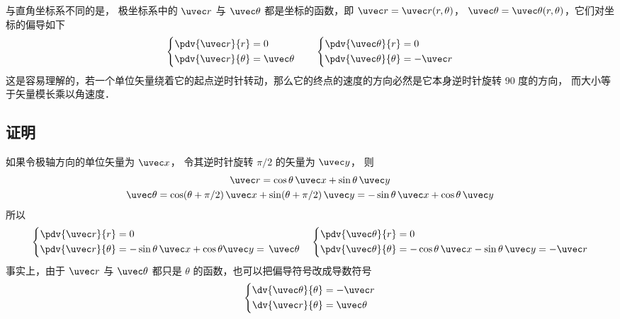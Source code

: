 

与直角坐标系不同的是， 极坐标系中的 $\uvec r$ 与 $\uvec \theta $ 都是坐标的函数，即 $\uvec r = \uvec r (r,\theta)$， $\uvec \theta  = \uvec \theta (r,\theta)$，它们对坐标的偏导如下
\begin{equation}\label{Dpol1_eq1}
\left\{ \begin{aligned}
\pdv{\uvec r}{r} &= 0\\
\pdv{\uvec r}{\theta} &= \uvec \theta 
\end{aligned} \right.
\qquad
\left\{ \begin{aligned}
\pdv{\uvec \theta}{r} &= 0\\
\pdv{\uvec \theta}{\theta} &=  - \uvec r
\end{aligned} \right.
\end{equation}
这是容易理解的，若一个单位矢量绕着它的起点逆时针转动，那么它的终点的速度的方向必然是它本身逆时针旋转 90 度的方向， 而大小等于矢量模长乘以角速度．
\subsection{证明}
如果令极轴方向的单位矢量为 $\uvec x$， 令其逆时针旋转 $\pi/2$ 的矢量为 $\uvec y$， 则
\begin{gather}
\uvec r = \cos \theta \,\uvec x + \sin \theta \,\uvec y\\
\uvec \theta  = \cos (\theta +\pi/2)\,\uvec x + \sin (\theta +\pi/2)\,\uvec y
=  - \sin \theta \,\uvec x + \cos \theta \,\uvec y
\end{gather} 
所以
\begin{equation}
\left\{ \begin{aligned}
\pdv{\uvec r}{r} &= 0\\
\pdv{\uvec r}{\theta} &=  - \sin \theta \,\uvec x + \cos \theta \uvec y = \,\uvec \theta 
\end{aligned} \right.
\quad
\left\{ \begin{aligned}
\pdv{\uvec \theta}{r} &= 0\\
\pdv{\uvec \theta}{\theta} &=  - \cos \theta \,\uvec x - \sin \theta \,\uvec y =  - \uvec r
\end{aligned} \right.
\end{equation}  
事实上，由于 $\uvec r$ 与 $\uvec \theta $ 都只是 $\theta$ 的函数，也可以把偏导符号改成导数符号
 \begin{equation}
\left\{ \begin{aligned}
\dv{\uvec \theta}{\theta} &=  - \uvec r\\
\dv{\uvec r}{\theta} &= \uvec \theta 
\end{aligned} \right.
\end{equation}
 
 
 
 
 
 
 
 
 
 
 
 
 
 
 
 
 
 
 
 
 
 
 
 
 
 